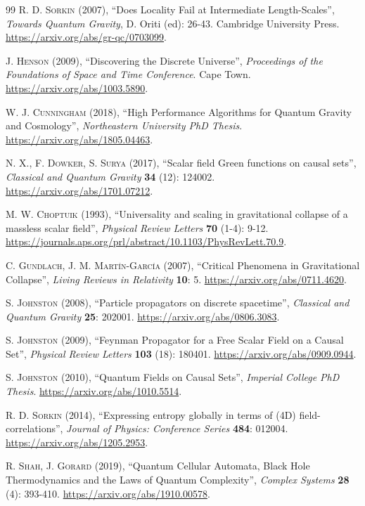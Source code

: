 \documentclass{article}
\begin{document}
\begin{thebibliography}{99}
\textsc{R. D. Sorkin} (2007), ``Does Locality Fail at Intermediate Length-Scales'', \textit{Towards Quantum Gravity}, D. Oriti (ed): 26-43. Cambridge University Press. \url{https://arxiv.org/abs/gr-qc/0703099}.

\textsc{J. Henson} (2009), ``Discovering the Discrete Universe'', \textit{Proceedings of the Foundations of Space and Time Conference}. Cape Town. \url{https://arxiv.org/abs/1003.5890}.

\textsc{W. J. Cunningham} (2018), ``High Performance Algorithms for Quantum Gravity and Cosmology'', \textit{Northeastern University PhD Thesis}. \url{https://arxiv.org/abs/1805.04463}.

\textsc{N. X., F. Dowker, S. Surya} (2017), ``Scalar field Green functions on causal sets'', \textit{Classical and Quantum Gravity} \textbf{34} (12): 124002. \url{https://arxiv.org/abs/1701.07212}.

\textsc{M. W. Choptuik} (1993), ``Universality and scaling in gravitational collapse of a massless scalar field'', \textit{Physical Review Letters} \textbf{70} (1-4): 9-12. \url{https://journals.aps.org/prl/abstract/10.1103/PhysRevLett.70.9}.

\textsc{C. Gundlach, J. M. Mart\'in-Garc\'ia} (2007), ``Critical Phenomena in Gravitational Collapse'', \textit{Living Reviews in Relativity} \textbf{10}: 5. \url{https://arxiv.org/abs/0711.4620}.

\textsc{S. Johnston} (2008), ``Particle propagators on discrete spacetime'', \textit{Classical and Quantum Gravity} \textbf{25}: 202001. \url{https://arxiv.org/abs/0806.3083}.

\textsc{S. Johnston} (2009), ``Feynman Propagator for a Free Scalar Field on a Causal Set'', \textit{Physical Review Letters} \textbf{103} (18): 180401. \url{https://arxiv.org/abs/0909.0944}.

\textsc{S. Johnston} (2010), ``Quantum Fields on Causal Sets'', \textit{Imperial College PhD Thesis}. \url{https://arxiv.org/abs/1010.5514}.

\textsc{R. D. Sorkin} (2014), ``Expressing entropy globally in terms of (4D) field-correlations'', \textit{Journal of Physics: Conference Series} \textbf{484}: 012004. \url{https://arxiv.org/abs/1205.2953}.

\textsc{R. Shah, J. Gorard} (2019), ``Quantum Cellular Automata, Black Hole Thermodynamics and the Laws of Quantum Complexity'', \textit{Complex Systems} \textbf{28} (4): 393-410. \url{https://arxiv.org/abs/1910.00578}.
\end{thebibliography}
\end{document}
